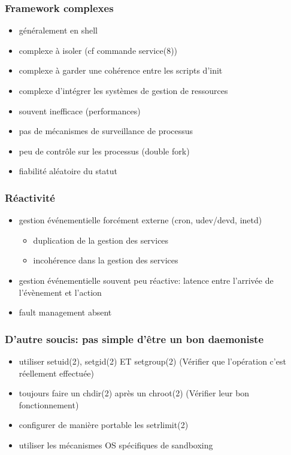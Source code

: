 \begin{frame}
	\frametitle{Framework complexes}
	\begin{itemize}
			\pause
		\item généralement en shell
			\pause
		\item complexe à isoler (cf commande service(8))
			\pause
		\item complexe à garder une cohérence entre les scripts d'init
			\pause
		\item complexe d'intégrer les systèmes de gestion de ressources
			\pause
		\item souvent inefficace (performances)
			\pause
		\item pas de mécanismes de surveillance de processus
			\pause
		\item peu de contrôle sur les processus (double fork)
			\pause
		\item fiabilité aléatoire du statut
	\end{itemize}
\end{frame}

\begin{frame}
	\frametitle{Réactivité}
	\begin{itemize}
			\pause
		\item gestion événementielle forcément externe (cron, udev/devd, inetd)
			\pause
			\begin{itemize}
				\item duplication de la gestion des services
				\item incohérence dans la gestion des services
			\end{itemize}
			\pause
		\item gestion événementielle souvent peu réactive: latence entre l'arrivée de l'évènement et l'action
			\pause
		\item fault management absent
	\end{itemize}
\end{frame}

\begin{frame}
	\frametitle{D'autre soucis: pas simple d'être un bon daemoniste}
	\begin{itemize}
			\pause
		\item utiliser setuid(2), setgid(2) ET setgroup(2) (Vérifier que l'opération c'est réellement effectuée)
			\pause
		\item toujours faire un chdir(2) après un chroot(2) (Vérifier leur bon fonctionnement)
			\pause
		\item configurer de manière portable les setrlimit(2)
			\pause
		\item utiliser les mécanismes OS spécifiques de sandboxing
	\end{itemize}
\end{frame}

